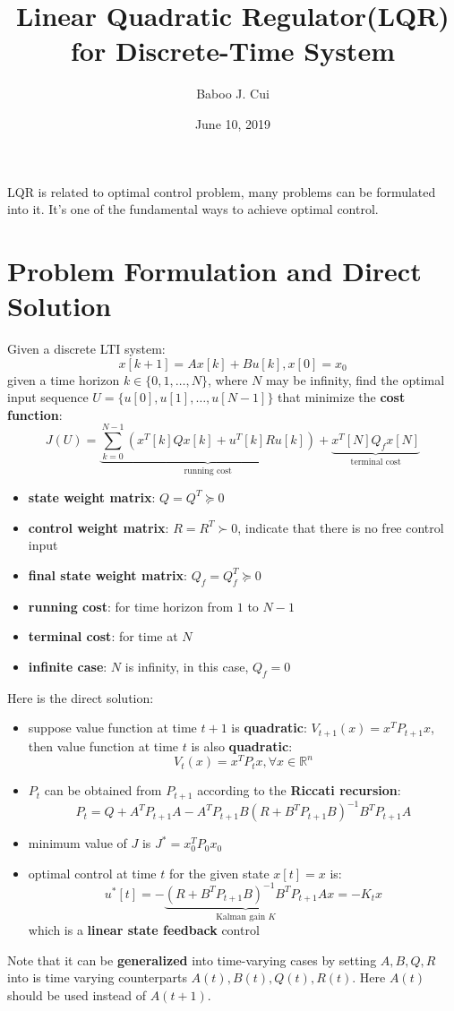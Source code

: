 \documentclass[10pt,a4paper,oneside]{article}
\date{June 10, 2019}
\author{Baboo J. Cui}
\title{Linear Quadratic Regulator(LQR) for Discrete-Time System}
\begin{document}
\maketitle
\tableofcontents

\newpage

LQR is related to optimal control problem, many problems can be formulated into it. It's one of the fundamental ways to achieve optimal control.

\section{Problem Formulation and Direct Solution}
Given a discrete LTI system:
\[
x[k+1] = Ax[k] + Bu[k], x[0] = x_0
\]
given a time horizon $k \in \{0, 1, \dots, N\}$, where $N$ may be infinity, find the optimal input sequence $U = \{u[0], u[1], \dots, u[N-1]\}$ that minimize the \textbf{cost function}:
\[
J(U) = \underbrace{\sum_{k=0}^{N-1}\left(x^T[k] Qx[k] +u^T[k] Ru[k]\right)}_{\text{running cost}} + \underbrace{x^T[N]Q_f x[N]}_{\text{terminal cost}}
\]

\begin{itemize}
	\item \textbf{state weight matrix}: $Q = Q^T \succeq 0$
	\item \textbf{control weight matrix}: $R = R^T \succ 0$, indicate that there is no free control input
	\item \textbf{final state weight matrix}: $Q_f = Q_f^T \succeq 0$
	\item \textbf{running cost}: for time horizon from $1$ to $N-1$
	\item \textbf{terminal cost}: for time at $N$
	\item \textbf{infinite case}: $N$ is infinity, in this case, $Q_f = 0$
\end{itemize}
Here is the direct solution:
\begin{itemize}
	\item suppose value function at time $t+1$ is \textbf{quadratic}: $V_{t+1}(x)=x^TP_{t+1}x$, then value function at time $t$ is also \textbf{quadratic}:
	\[
	V_t(x)=x^T P_t x, \forall x\in \mathbb{R}^n
	\]
	\item $P_t$ can be obtained from $P_{t+1}$ according to the \textbf{Riccati recursion}:
	\[
	P_t=Q+A^TP_{t+1}A - A^TP_{t+1}B(R+B^TP_{t+1}B)^{-1}B^TP_{t+1}A
	\]
	\item minimum value of $J$ is $J^* = x_0^T P_0 x_0$
	\item optimal control at time $t$ for the given state $x[t]=x$ is:
	\[
	u^*[t] = -\underbrace{(R+B^T P_{t+1} B)^{-1}B^T P_{t+1} A }_{\text{Kalman gain } K} x= - K_tx
	\]
	which is a \textbf{linear state feedback} control
\end{itemize}
Note that it can be \textbf{generalized} into time-varying cases by setting $A, B, Q, R$ into is time varying counterparts $A(t), B(t), Q(t), R(t)$. Here $A(t)$ should be used instead of $A(t+1)$.
\end{document}
